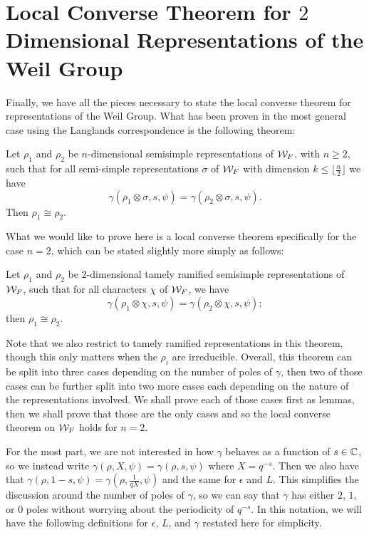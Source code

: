 \section{Local Converse Theorem for $2$ Dimensional Representations of the Weil Group}
\label{sec:n=2-LCT-weil-group}
Finally, we have all the pieces necessary to state the local converse theorem for representations of the Weil Group.
What has been proven in the most general case using the Langlands correspondence is the following theorem:

\begin{theorem}
  Let $\rho_1$ and $\rho_2$ be $n$-dimensional semisimple representations of $\cW_F$, with $n \geq 2$, such that for all semi-simple representations $\sigma$ of $\cW_F$ with dimension $k \leq \lfloor \frac{n}{2} \rfloor$ we have
  \[\gamma(\rho_1 \otimes \sigma,s,\psi) = \gamma(\rho_2 \otimes \sigma,s,\psi).\]
  Then $\rho_1 \cong \rho_2$.
\end{theorem}


What we would like to prove here is a local converse theorem specifically for the case $n=2$, which can be stated slightly more simply as follows:

\begin{theorem}[Local Converse Theorem on $\cW_F$ with $n=2$]
  \label{thm:LCTn=2}
  Let $\rho_1$ and $\rho_2$ be $2$-dimensional tamely ramified semisimple representations of $\cW_F$, such that for all characters $\chi$ of $\cW_F$, we have
  \[\gamma(\rho_1 \otimes \chi,s,\psi) = \gamma(\rho_2 \otimes \chi,s,\psi);\]
  then $\rho_1 \cong \rho_2$.
\end{theorem}

Note that we also restrict to tamely ramified representations in this theorem, though this only matters when the $\rho_i$ are irreducible.
Overall, this theorem can be split into three cases depending on the number of poles of $\gamma$, then two of those cases can be further split into two more cases each depending on the nature of the representations involved.
We shall prove each of those cases first as lemmas, then we shall prove that those are the only cases and so the local converse theorem on $\cW_F$ holds for $n=2$.

For the most part, we are not interested in how $\gamma$ behaves as a function of $s \in \mathbb{C}$, so we instead write $\gamma(\rho, X, \psi) = \gamma(\rho,s,\psi)$ where $X = q^{-s}$.
Then we also have that $\gamma(\rho,1-s,\psi) = \gamma(\rho,\frac{1}{qX},\psi)$ and the same for $\epsilon$ and $L$.
This simplifies the discussion around the number of poles of $\gamma$, so we can say that $\gamma$ has either $2$, $1$, or $0$ poles without worrying about the periodicity of $q^{-s}$.
In this notation, we will have the following definitions for $\epsilon$, $L$, and $\gamma$ restated here for simplicity.


